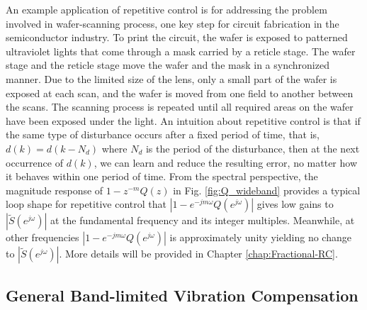 \documentclass [11pt, proquest] {uwthesis}[2020/02/24]
\begin{document}
An example application of repetitive control is for addressing the
problem involved in wafer-scanning process, one key step for circuit
fabrication in the semiconductor industry. To print the circuit, the
wafer is exposed to patterned ultraviolet lights that come through
a mask carried by a reticle stage. The wafer stage and the reticle
stage move the wafer and the mask in a synchronized manner. Due to
the limited size of the lens, only a small part of the wafer is exposed
at each scan, and the wafer is moved from one field to another between
the scans. The scanning process is repeated until all required areas
on the wafer have been exposed under the light. An intuition about
repetitive control is that if the same type of disturbance occurs
after a fixed period of time, that is, $d(k)=d(k-N_{d})$ where $N_{d}$
is the period of the disturbance, then at the next occurrence of $d(k)$,
we can learn and reduce the resulting error, no matter how it behaves
within one period of time. From the spectral perspective, the magnitude
response of $1-z^{-m}Q(z)$ in Fig. \ref{fig:Q_wideband}
provides a typical loop shape for repetitive control that $|1-e^{-jm\omega}Q(e^{j\omega})|$
gives low gains to $|\tilde{S}(e^{j\omega})|$ at the fundamental
frequency and its integer multiples. Meanwhile, at other frequencies
$|1-e^{-jm\omega}Q(e^{j\omega})|$ is approximately unity yielding
no change to $|\tilde{S}(e^{j\omega})|$. More details will be provided in Chapter \ref{chap:Fractional-RC}.

\subsection{General Band-limited Vibration Compensation}
\end{document}
